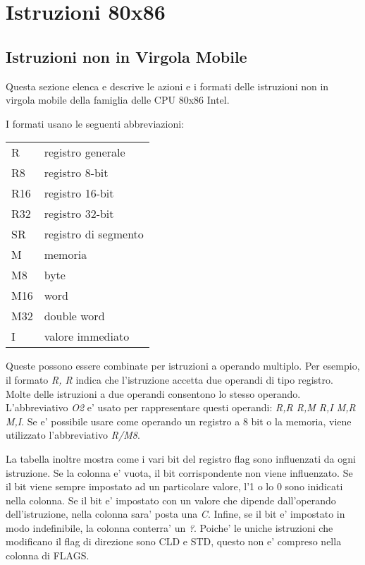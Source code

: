\chapter{Istruzioni 80x86}
\section{Istruzioni non in Virgola Mobile}
Questa sezione elenca e descrive le azioni e i formati delle
istruzioni non in virgola mobile della famiglia delle CPU
80x86 Intel.

I formati usano le seguenti abbreviazioni:
\begin{center}
\begin{tabular}{|l|l|}
\hline
R   & registro generale \\
R8  & registro 8-bit \\
R16 & registro 16-bit \\
R32 & registro 32-bit \\
SR  & registro di segmento \\
M   & memoria \\
M8  & byte \\
M16 & word \\
M32 & double word \\
I   & valore immediato \\
\hline
\end{tabular}
\end{center}
Queste possono essere combinate per istruzioni a operando multiplo. Per
esempio, il formato \emph{R, R} indica che l'istruzione accetta due
operandi di tipo registro. Molte delle istruzioni a due operandi consentono
lo stesso operando. L'abbreviativo \emph{O2} e' usato per rappresentare
questi operandi: \emph{R,R R,M R,I M,R M,I}. Se e' possibile usare come
operando un registro a 8 bit o la memoria, viene utilizzato l'abbreviativo
\emph{R/M8}.

La tabella inoltre mostra come i vari bit del registro flag sono influenzati
da ogni istruzione. Se la colonna e' vuota, il bit corrispondente non viene
influenzato. Se il bit viene sempre impostato ad un particolare valore, l'1 o 
lo 0 sono inidicati nella colonna. Se il bit e' impostato con un valore che 
dipende dall'operando dell'istruzione, nella colonna sara' posta una \emph{C}.
Infine, se il bit e' impostato in modo indefinibile, la colonna conterra' un
\emph{?}. Poiche' le uniche istruzioni che modificano il flag di direzione
sono {\code CLD} e {\code STD}, questo non e' compreso nella colonna di
FLAGS.

